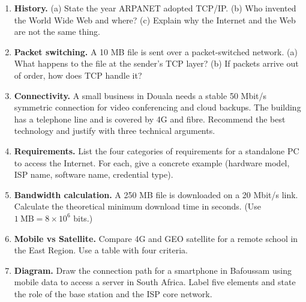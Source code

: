 \documentclass[11pt]{article}
\begin{document}
\begin{exercice}
\begin{enumerate}
\item \textbf{History.} (a) State the year ARPANET adopted TCP/IP. (b) Who invented the World Wide Web and where? (c) Explain why the Internet and the Web are not the same thing.
\item \textbf{Packet switching.} A 10 MB file is sent over a packet-switched network. (a) What happens to the file at the sender's TCP layer? (b) If packets arrive out of order, how does TCP handle it?
\item \textbf{Connectivity.} A small business in Douala needs a stable 50 Mbit/s symmetric connection for video conferencing and cloud backups. The building has a telephone line and is covered by 4G and fibre. Recommend the best technology and justify with three technical arguments.
\item \textbf{Requirements.} List the four categories of requirements for a standalone PC to access the Internet. For each, give a concrete example (hardware model, ISP name, software name, credential type).
\item \textbf{Bandwidth calculation.} A 250 MB file is downloaded on a 20 Mbit/s link. Calculate the theoretical minimum download time in seconds. (Use $1\ \mathrm{MB}=8\times10^6$ bits.)
\item \textbf{Mobile vs Satellite.} Compare 4G and GEO satellite for a remote school in the East Region. Use a table with four criteria.
\item \textbf{Diagram.} Draw the connection path for a smartphone in Bafoussam using mobile data to access a server in South Africa. Label five elements and state the role of the base station and the ISP core network.
\end{enumerate}
\end{exercice}
\end{document}
